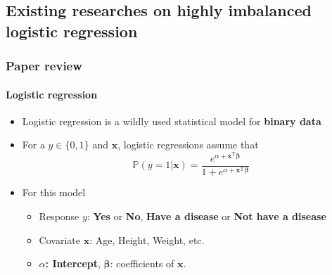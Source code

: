 \documentclass{beamer}
\newcommand{\red}{\color{red}}
\newcommand{\blue}{\color{blue}}
\newcommand{\bbeta}{\bm{\beta}}
\newcommand{\x}{\bm{x}}
\newcommand{\tp}{^{\mathrm{T}}}
\newcommand{\pr}{\mathbb{P}}
\newcommand{\rhl}[1]{{\red \textbf{#1}}}
\newcommand{\bhl}[1]{{\blue \textbf{#1}}}
\begin{document}
 \subsection{Existing researches on highly imbalanced logistic regression}
    \begin{frame}
        \frametitle{Paper review}
        \framesubtitle{Logistic regression}
        \begin{itemize}
            \item Logistic regression is a wildly used statistical model for \rhl{binary data}
            \item For a $y\in\{0,1\}$ and $\x$, logistic regressions assume that
            \begin{equation*}
                \pr(y=1|\x)=\frac{e^{\alpha+\x\tp\bbeta}}{1+e^{\alpha+\x\tp\bbeta}}
            \end{equation*}
            \item For this model
            \begin{itemize}
                \item Response $y$: \bhl{Yes} or \bhl{No}, \bhl{Have a disease} or \bhl{Not have a disease}
                \item Covariate $\x$: Age, Height, Weight, etc.
                \item \rhl{$\alpha$: Intercept}, $\bbeta$: coefficients of $\x$.
            \end{itemize}
        \end{itemize}
    \end{frame}
    
\end{document}
